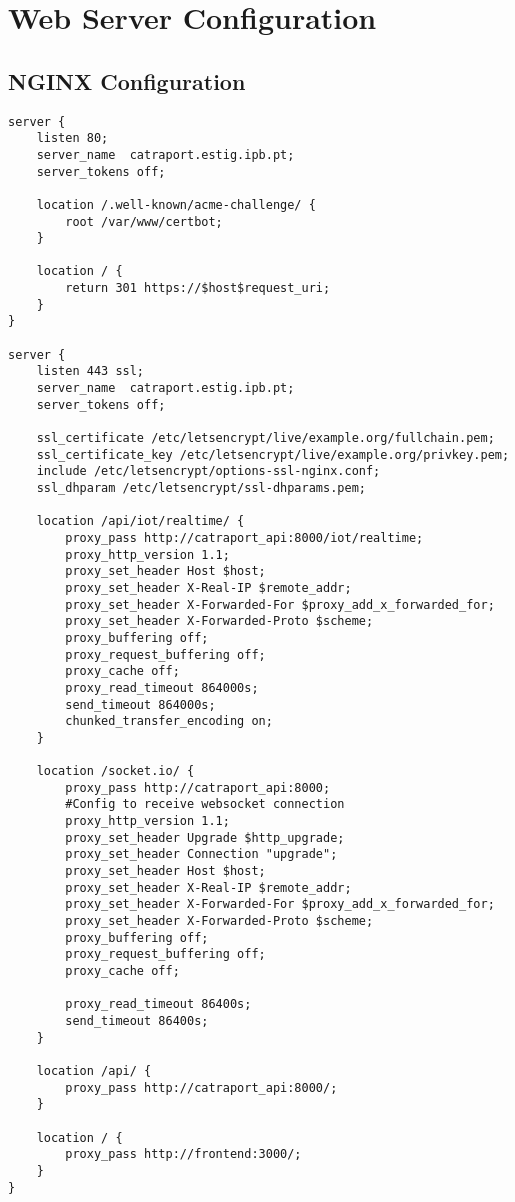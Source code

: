 \chapter{Web Server Configuration}\label{webServer}

\section{NGINX Configuration}\label{apendice1nginx}
\begin{Verbatim}[fontsize=\small, baselinestretch=0.8]
    server {
    listen 80;
    server_name  catraport.estig.ipb.pt;
    server_tokens off;

    location /.well-known/acme-challenge/ {
        root /var/www/certbot;
    }

    location / {
        return 301 https://$host$request_uri;
    }
}

server {
    listen 443 ssl;
    server_name  catraport.estig.ipb.pt;
    server_tokens off;

    ssl_certificate /etc/letsencrypt/live/example.org/fullchain.pem;
    ssl_certificate_key /etc/letsencrypt/live/example.org/privkey.pem;
    include /etc/letsencrypt/options-ssl-nginx.conf;
    ssl_dhparam /etc/letsencrypt/ssl-dhparams.pem;

    location /api/iot/realtime/ {
        proxy_pass http://catraport_api:8000/iot/realtime;
        proxy_http_version 1.1;
        proxy_set_header Host $host;
        proxy_set_header X-Real-IP $remote_addr;
        proxy_set_header X-Forwarded-For $proxy_add_x_forwarded_for;
        proxy_set_header X-Forwarded-Proto $scheme;
        proxy_buffering off;
        proxy_request_buffering off;
        proxy_cache off;
        proxy_read_timeout 864000s;
        send_timeout 864000s;
        chunked_transfer_encoding on;
    }

    location /socket.io/ {
        proxy_pass http://catraport_api:8000;
        #Config to receive websocket connection
        proxy_http_version 1.1;
        proxy_set_header Upgrade $http_upgrade;
        proxy_set_header Connection "upgrade";
        proxy_set_header Host $host;
        proxy_set_header X-Real-IP $remote_addr;
        proxy_set_header X-Forwarded-For $proxy_add_x_forwarded_for;
        proxy_set_header X-Forwarded-Proto $scheme;
        proxy_buffering off;
        proxy_request_buffering off;
        proxy_cache off;

        proxy_read_timeout 86400s;
        send_timeout 86400s;
    }

    location /api/ {
        proxy_pass http://catraport_api:8000/;
    }

    location / {
        proxy_pass http://frontend:3000/;
    }
}
\end{Verbatim}


